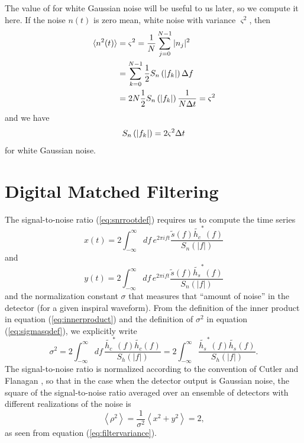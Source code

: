 The value of \ospsd for white Gaussian noise will be useful to us later, so we
compute it here. If the noise $n(t)$ is zero mean, white noise with variance
$\varsigma^2$, then
\begin{equation}
\begin{split}
\langle n^2(t) \rangle &= \varsigma^2 = \frac{1}{N} \sum_{j=0}^{N-1} |n_j|^2 \\
&= \sum_{k=0}^{N-1} \frac{1}{2} S_n\left(\left|f_{k}\right|\right) \Delta f \\
&= 2N \frac{1}{2} S_n\left(\left|f_{k}\right|\right) \frac{1}{N\Delta t} = \varsigma^2
\end{split}
\end{equation}
and we have
\begin{equation}
S_n\left(\left|f_{k}\right|\right) = 2\varsigma^2\Delta t 
\end{equation}
for white Gaussian noise.

\section{Digital Matched Filtering}
\label{s:matchedfilter}

The signal-to-noise ratio (\ref{eq:snrrootdef}) requires us to compute
the time series
\begin{equation}
\label{eq:xcts}
x(t) = 2 \int_{-\infty}^{\infty}df\,e^{2\pi i f t} 
\frac{\tilde{s}(f) \tilde{h_c}^\ast(f)}{S_n\left(\left|f\right|\right)}
\end{equation}
and
\begin{equation}
\label{eq:ycts}
y(t) = 2 \int_{-\infty}^{\infty}df\,e^{2\pi i f t} 
\frac{\tilde{s}(f) \tilde{h_s}^\ast(f)}{S_n\left(\left|f\right|\right)}
\end{equation}
and the normalization constant $\sigma$ that measures that ``amount of noise''
in the detector (for a given inspiral waveform). From the definition of the
inner product in equation (\ref{eq:innerproduct}) and the definition of
$\sigma^2$ in equation (\ref{eq:sigmasqdef}), we explicitly write
\begin{equation}
\label{eq:sigmasqcts}
\sigma^2 = 2 \int_{-\infty}^{\infty}df\,
\frac{\tilde{h_c}^\ast(f)\tilde{h_c}(f)}{S_h\left(\left|f\right|\right)} 
= 2 \int_{-\infty}^\infty 
\frac{\tilde{h_s}^\ast(f)\tilde{h_s}(f)}{S_h\left(\left|f\right|\right)}.
\end{equation}
The signal-to-noise ratio is normalized according to the convention
of Cutler and Flanagan \cite{Cutler:1994}, so that in the case when the detector
output is Gaussian noise, the square of the signal-to-noise ratio averaged
over an ensemble of detectors with different realizations of the noise is
\begin{equation}
\left\langle \rho^2 \right\rangle = 
\frac{1}{\sigma^2} \left\langle x^2 + y^2 \right\rangle = 2,
\end{equation}
as seen from equation (\ref{eq:filtervariance}).

